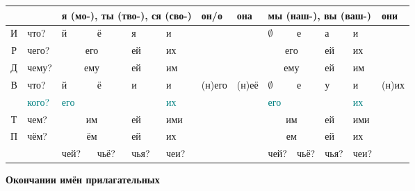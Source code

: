\documentclass[a4paper, landscape, 11pt]{article}
\newcommand{\an}[1]{\textcolor{teal}{#1}} %
\begin{document}
\begin{tabularx}{\textwidth}{|c|X|X|X|X|X|X|X|X|X|X|X|X|}
	\hline
	\strut & \strut     & \multicolumn{4}{l|}{я (мо-), ты (тво-), ся (сво-)} & он/о   & она    & \multicolumn{4}{l|}{мы (наш-), вы (ваш-)}   & они    \\ \hline
	  И    & что?       & й        & ё             & я      & и              & \strut & \strut & $\emptyset$ & е          & а      & и       & \strut \\ %
	  Р    & чего?      & \multicolumn{2}{c|}{его} & ей     & их             & \strut & \strut & \multicolumn{2}{c|}{его} & ей     & их      & \strut \\ %
	  Д    & чему?      & \multicolumn{2}{c|}{ему} & ей     & им             & \strut & \strut & \multicolumn{2}{c|}{ему} & ей     & им      & \strut \\ %
	  В    & что?       & й        & ё             & и      & и              & (н)его & (н)её  & $\emptyset$ & е          & у      & и       & (н)их  \\
	\strut & \an{кого?} & \an{его} & \strut        & \strut & \an{их}        & \strut & \strut & \an{его}    & \strut     & \strut & \an{их} & \strut \\ %
	  Т    & чем?       & \multicolumn{2}{c|}{им}  & ей     & ими            & \strut & \strut & \multicolumn{2}{c|}{им}  & ей     & ими     & \strut \\ %
	  П    & чём?       & \multicolumn{2}{c|}{ём}  & ей     & их             & \strut & \strut & \multicolumn{2}{c|}{ем}  & ей     & их      & \strut \\ \hline
	\strut & \strut     & чей?     & чьё?          & чья?   & чеи?           & \strut & \strut & чей?        & чьё?       & чья?   & чеи?    & \strut \\ \hline
\end{tabularx}

\vfill\strut

\newpage

\begin{center}
	\Huge\bfseries Окончании имён прилагательных
\end{center}
\end{document}
